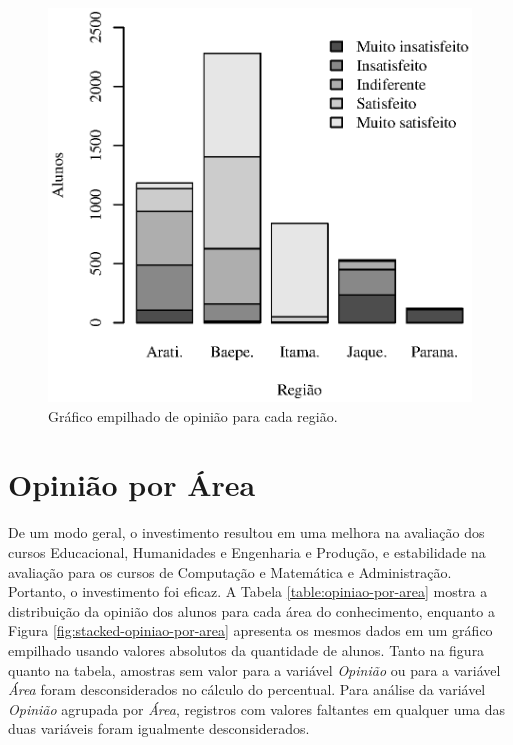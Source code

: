 \documentclass[10pt,a4paper,oneside]{article}
\newcommand{\adm}{Administração\xspace}
\newcommand{\comp}{Computação e Matemática\xspace}
\newcommand{\edu}{Educacional\xspace}
\newcommand{\eng}{Engenharia e Produção\xspace}
\newcommand{\hum}{Humanidades\xspace}
\begin{document}
\begin{figure}[!h]
	\centering
	\includegraphics[]{plots/stacked_opiniao_por_regiao.eps}
	\caption{Gráfico empilhado de opinião para cada região.}
	\label{fig:stacked-opiniao-por-regiao}
\end{figure}

\clearpage{}

\FloatBarrier
\section{Opinião por Área}
\label{section:opiniao-area}

De um modo geral, o investimento resultou em uma melhora na avaliação dos cursos \edu, \hum e \eng, e estabilidade na avaliação para os cursos de \comp e \adm. Portanto, o investimento foi eficaz. A Tabela \ref{table:opiniao-por-area} mostra a distribuição da opinião dos alunos para cada área do conhecimento, enquanto a Figura \ref{fig:stacked-opiniao-por-area} apresenta os mesmos dados em um gráfico empilhado usando valores absolutos da quantidade de alunos. Tanto na figura quanto na tabela, amostras sem valor para a variável \textit{Opinião} ou para a variável \textit{Área} foram desconsiderados no cálculo do percentual. Para análise da variável \textit{Opinião} agrupada por \textit{Área}, registros com valores faltantes em qualquer uma das duas variáveis foram igualmente desconsiderados.
\end{document}
